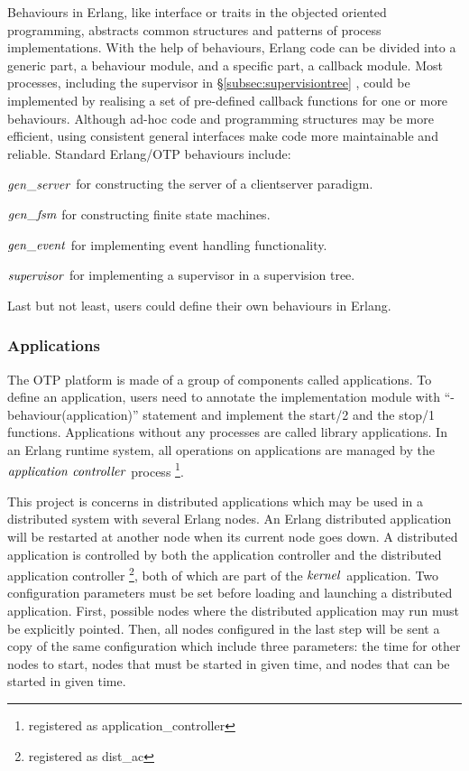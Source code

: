 Behaviours in Erlang, like interface or traits in the objected oriented programming, abstracts common structures and patterns of process implementations.  With the help of behaviours, Erlang code can be divided into a generic part, a behaviour module, and a specific part, a callback module.  Most processes, including the supervisor in \S\ref{subsec:supervisiontree} , could be implemented by realising a set of pre-defined callback functions for one or more behaviours.  Although ad-hoc code and programming structures may be more efficient, using consistent general interfaces make code more maintainable and reliable.  Standard Erlang/OTP behaviours include: 
\begin{inparaenum} [i)]
  \item $\it{gen\_server}$  for constructing the server of a client\-server paradigm. 
  \item $\it{gen\_fsm}$ for constructing finite state machines. 
  \item $\it{gen\_event}$ for implementing event handling functionality. 
  \item $\it{supervisor}$ for implementing a supervisor in a supervision tree. 
\end{inparaenum}
Last but not least, users could define their own behaviours in Erlang.


\subsubsection{Applications}

The OTP platform is made of a group of components called applications.  To define an application, users need to annotate the implementation module with ``-behaviour(application)'' statement and implement the start/2 and the stop/1 functions.  Applications without any processes are called library applications.  In an Erlang runtime system, all operations on applications are managed by the $\it{application\ controller}$ process \footnote{registered as application\_controller}.

This project is concerns in distributed applications which may be used in a distributed system with several Erlang nodes.  An Erlang distributed application will be restarted at another node when its current node goes down.  A distributed application is controlled by both the application controller and the distributed application controller \footnote{registered as dist\_ac}, both of which are part of the $\it{kernel}$ application.  Two configuration parameters must be set before loading and launching a distributed application.  First, possible nodes where the distributed application may run must be explicitly pointed.  Then, all nodes configured in the last step will be sent a copy of the same configuration which include three parameters: the time for other nodes to start, nodes that must be started in given time, and nodes that can be started in given time.
